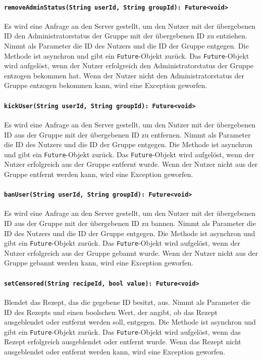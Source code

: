 \documentclass{entwurfsheft}
\begin{document}
\paragraph{\texttt{removeAdminStatus(String userId, String groupId): Future<void>}}
Es wird eine Anfrage an den Server gestellt, um den Nutzer mit der übergebenen ID den Administratorstatus der Gruppe mit der übergebenen ID zu entziehen. Nimmt als Parameter die ID des Nutzers und die ID der Gruppe entgegen. Die Methode ist asynchron und gibt ein \texttt{Future}-Objekt zurück. Das \texttt{Future}-Objekt wird aufgelöst, wenn der Nutzer erfolgreich den Administratorstatus der Gruppe entzogen bekommen hat. Wenn der Nutzer nicht den Administratorstatus der Gruppe entzogen bekommen kann, wird eine Exception geworfen.
\paragraph{\texttt{kickUser(String userId, String groupId): Future<void>}}
Es wird eine Anfrage an den Server gestellt, um den Nutzer mit der übergebenen ID aus der Gruppe mit der übergebenen ID zu entfernen. Nimmt als Parameter die ID des Nutzers und die ID der Gruppe entgegen. Die Methode ist asynchron und gibt ein \texttt{Future}-Objekt zurück. Das \texttt{Future}-Objekt wird aufgelöst, wenn der Nutzer erfolgreich aus der Gruppe entfernt wurde. Wenn der Nutzer nicht aus der Gruppe entfernt werden kann, wird eine Exception geworfen.
\paragraph{\texttt{banUser(String userId, String groupId): Future<void>}}
Es wird eine Anfrage an den Server gestellt, um den Nutzer mit der übergebenen ID aus der Gruppe mit der übergebenen ID zu bannen. Nimmt als Parameter die ID des Nutzers und die ID der Gruppe entgegen. Die Methode ist asynchron und gibt ein \texttt{Future}-Objekt zurück. Das \texttt{Future}-Objekt wird aufgelöst, wenn der Nutzer erfolgreich aus der Gruppe gebannt wurde. Wenn der Nutzer nicht aus der Gruppe gebannt werden kann, wird eine Exception geworfen.
\paragraph{\texttt{setCensored(String recipeId, bool value): Future<void>}}
Blendet das Rezept, das die gegebene ID besitzt, aus. Nimmt als Parameter die ID des Rezepts und einen boolschen Wert, der angibt, ob das Rezept ausgeblendet oder entfernt werden soll, entgegen. Die Methode ist asynchron und gibt ein \texttt{Future}-Objekt zurück. Das \texttt{Future}-Objekt wird aufgelöst, wenn das Rezept erfolgreich ausgeblendet oder entfernt wurde. Wenn das Rezept nicht ausgeblendet oder entfernt werden kann, wird eine Exception geworfen.
\newpage
\end{document}
